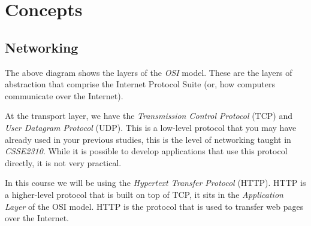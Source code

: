 \documentclass{csse4400}
\begin{document}
\section{Concepts}
\subsection{Networking}


\begin{center}
\end{center}

The above diagram shows the layers of the \textsl{OSI} model.
These are the layers of abstraction that comprise the Internet Protocol Suite (or, how computers communicate over the Internet).

At the transport layer, we have the \textsl{Transmission Control Protocol} (TCP) and \textsl{User Datagram Protocol} (UDP).
This is a low-level protocol that you may have already used in your previous studies,
this is the level of networking taught in \textsl{CSSE2310}.
While it is possible to develop applications that use this protocol directly,
it is not very practical.

In this course we will be using the \textsl{Hypertext Transfer Protocol} (HTTP).
HTTP is a higher-level protocol that is built on top of TCP, it sits in the \textsl{Application Layer} of the OSI model.
HTTP is the protocol that is used to transfer web pages over the Internet.
\end{document}
